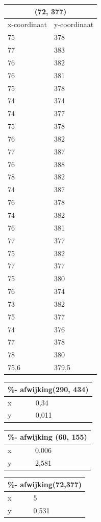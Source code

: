 \documentclass{article}
\begin{document}
\begin{tabular}{ |l|l| }
  \hline
  \multicolumn{2}{|c|}{(72, 377)} \\
  \hline
  x-coordinaat & y-coordinaat \\ \hline
     75 & 378\\ \hline
     77 & 383\\ \hline
     76 & 382\\ \hline
     76 & 381\\ \hline
     75 & 378\\ \hline
     74 & 374\\ \hline
     74 & 377\\ \hline
     75 & 378\\ \hline
     76 & 382\\ \hline
     77 & 387\\ \hline
     76 & 388\\ \hline
     78 & 382\\ \hline
     74 & 387\\ \hline
     76 & 378\\ \hline
     74 & 382\\ \hline
     76 & 381\\ \hline
     77 & 377\\ \hline
     75 & 382\\ \hline
     77 & 377\\ \hline
     75 & 380\\ \hline
     76 & 374\\ \hline
     73 & 382\\ \hline
     75 & 377\\ \hline
     74 & 376\\ \hline
     77 & 378\\ \hline
     78 & 380\\ \hline\hline
     75,6 & 379,5 \\ \hline 
\end{tabular}
\newline
\begin{tabular}{ |l|p{}| }
  \hline
  \multicolumn{2}{|c|}{\%- afwijking(290, 434)} \\
  \hline
  x & 0,34 \\ \hline
  y & 0,011 \\ \hline
\end{tabular}
\begin{tabular}{ |l|p{}| }
  \hline
  \multicolumn{2}{|c|}{\%- afwijking (60, 155)} \\
  \hline
  x & 0,006 \\ \hline
  y & 2,581 \\ \hline
\end{tabular}
\begin{tabular}{ |l|p{}| }
  \hline
  \multicolumn{2}{|c|}{\%- afwijking(72,377)} \\
  \hline
  x & 5 \\ \hline
  y & 0,531 \\ \hline
\end{tabular}
\end{document}

